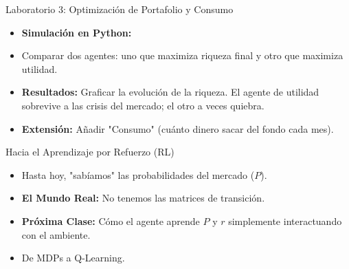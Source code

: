 \documentclass{beamer}
\begin{document}
\begin{frame}{Laboratorio 3: Optimización de Portafolio y Consumo}
\begin{itemize}
    \item \textbf{Simulación en Python:}
    \item Comparar dos agentes: uno que maximiza riqueza final y otro que maximiza utilidad.
    \item \textbf{Resultados:} Graficar la evolución de la riqueza. El agente de utilidad sobrevive a las crisis del mercado; el otro a veces quiebra.
    \item \textbf{Extensión:} Añadir "Consumo" (cuánto dinero sacar del fondo cada mes).
\end{itemize}
\end{frame}

\begin{frame}{Hacia el Aprendizaje por Refuerzo (RL)}
\begin{itemize}
    \item Hasta hoy, "sabíamos" las probabilidades del mercado ($P$).
    \item \textbf{El Mundo Real:} No tenemos las matrices de transición.
    \item \textbf{Próxima Clase:} Cómo el agente aprende $P$ y $r$ simplemente interactuando con el ambiente.
    \item De MDPs a Q-Learning.
\end{itemize}
\end{frame}
\end{document}
